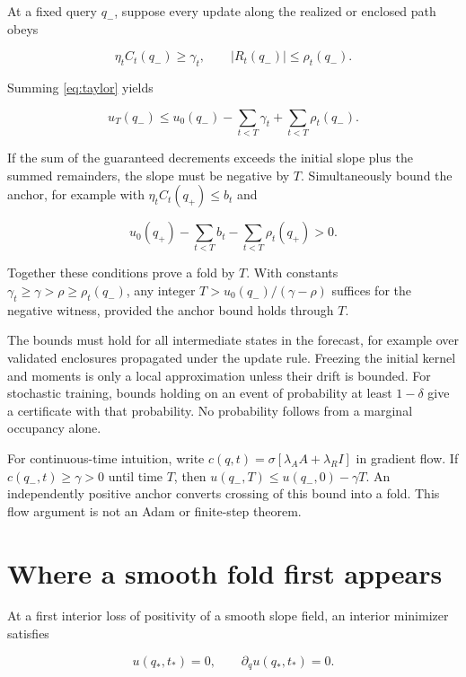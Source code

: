 \documentclass[11pt]{article}
\begin{document}
At a fixed query \(q_-\), suppose every update along the realized or
enclosed path obeys

\[
\eta_t C_t(q_-)\ge\gamma_t,\qquad |R_t(q_-)|\le\rho_t(q_-).
\]

Summing \eqref{eq:taylor} yields

\begin{equation}\label{eq:horizon-negative}
u_T(q_-)\le u_0(q_-)-\sum_{t<T}\gamma_t+\sum_{t<T}\rho_t(q_-).
\end{equation}

If the sum of the guaranteed decrements exceeds the initial slope plus
the summed remainders, the slope must be negative by \(T\).
Simultaneously bound the anchor, for example with
\(\eta_tC_t(q_+)\le b_t\) and

\begin{equation}\label{eq:horizon-anchor}
u_0(q_+)-\sum_{t<T}b_t-\sum_{t<T}\rho_t(q_+)>0.
\end{equation}

Together these conditions prove a fold by \(T\). With constants
\(\gamma_t\ge\gamma>\rho\ge\rho_t(q_-)\), any integer
\(T>u_0(q_-)/(\gamma-\rho)\) suffices for the negative witness, provided
the anchor bound holds through \(T\).

The bounds must hold for all intermediate states in the forecast, for
example over validated enclosures propagated under the update rule.
Freezing the initial kernel and moments is only a local approximation
unless their drift is bounded. For stochastic training, bounds holding
on an event of probability at least \(1-\delta\) give a certificate with
that probability. No probability follows from a marginal occupancy
alone.

For continuous-time intuition, write
\(c(q,t)=\sigma[\lambda_AA+\lambda_RI]\) in gradient flow. If
\(c(q_-,t)\ge\gamma>0\) until time \(T\), then
\(u(q_-,T)\le u(q_-,0)-\gamma T\). An independently positive anchor
converts crossing of this bound into a fold. This flow argument is not
an Adam or finite-step theorem.

\section{Where a smooth fold first
appears}\label{where-a-smooth-fold-first-appears}

At a first interior loss of positivity of a smooth slope field, an
interior minimizer satisfies

\begin{equation}\label{eq:interior-onset}
u(q_*,t_*)=0,\qquad \partial_qu(q_*,t_*)=0.
\end{equation}
\end{document}
